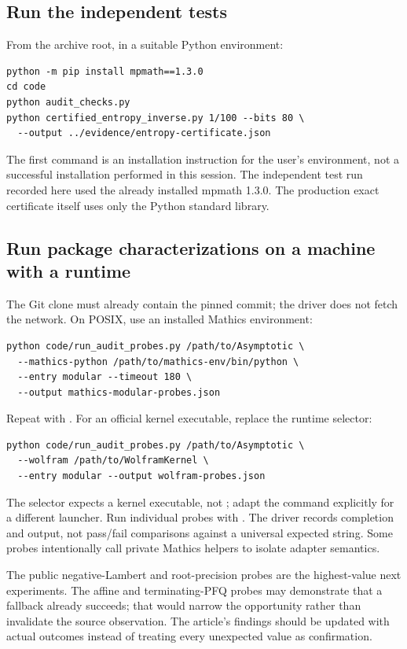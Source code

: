 \documentclass[11pt,letterpaper]{article}
\newcommand{\code}[1]{\texttt{\detokenize{#1}}}
\begin{document}
\subsection{Run the independent tests}

From the archive root, in a suitable Python environment:
\begin{lstlisting}
python -m pip install mpmath==1.3.0
cd code
python audit_checks.py
python certified_entropy_inverse.py 1/100 --bits 80 \
  --output ../evidence/entropy-certificate.json
\end{lstlisting}
The first command is an installation instruction for the user's environment, not a successful installation performed in this session. The independent test run recorded here used the already installed mpmath 1.3.0. The production exact certificate itself uses only the Python standard library.

\subsection{Run package characterizations on a machine with a runtime}

The Git clone must already contain the pinned commit; the driver does not fetch the network. On POSIX, use an installed Mathics environment:
\begin{lstlisting}
python code/run_audit_probes.py /path/to/Asymptotic \
  --mathics-python /path/to/mathics-env/bin/python \
  --entry modular --timeout 180 \
  --output mathics-modular-probes.json
\end{lstlisting}
Repeat with \code{--entry standalone}. For an official kernel executable, replace the runtime selector:
\begin{lstlisting}
python code/run_audit_probes.py /path/to/Asymptotic \
  --wolfram /path/to/WolframKernel \
  --entry modular --output wolfram-probes.json
\end{lstlisting}
The selector expects a kernel executable, not \code{wolframscript}; adapt the command explicitly for a different launcher. Run individual probes with \code{--case}. The driver records completion and output, not pass/fail comparisons against a universal expected string. Some probes intentionally call private Mathics helpers to isolate adapter semantics.

The public negative-Lambert and root-precision probes are the highest-value next experiments. The affine and terminating-PFQ probes may demonstrate that a fallback already succeeds; that would narrow the opportunity rather than invalidate the source observation. The article's findings should be updated with actual outcomes instead of treating every unexpected value as confirmation.
\end{document}
